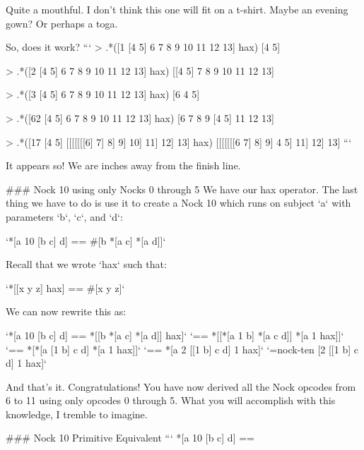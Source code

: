 \documentclass[twoside]{article}
\begin{document}
Quite a mouthful. I don't think this one will fit on a t-shirt. 
Maybe an evening gown? Or perhaps a toga.

So, does it work?
```
> .*([1 [4 5] 6 7 8 9 10 11 12 13] hax)
[4 5]

> .*([2 [4 5] 6 7 8 9 10 11 12 13] hax)
[[4 5] 7 8 9 10 11 12 13]

> .*([3 [4 5] 6 7 8 9 10 11 12 13] hax)
[6 4 5]

> .*([62 [4 5] 6 7 8 9 10 11 12 13] hax)
[6 7 8 9 [4 5] 11 12 13]

> .*([17 [4 5] [[[[[[[6] 7] 8] 9] 10] 11] 12] 13] hax)
[[[[[[[6 7] 8] 9] 4 5] 11] 12] 13]
```

It appears so! We are inches away from the finish line.

### Nock 10 using only Nocks 0 through 5
We have our hax operator. The last thing we have to do is use it to create a Nock 10 which runs on subject `a` with parameters `b`, `c`, and `d`:

`*[a 10 [b c] d] == #[b *[a c] *[a d]]`

Recall that we wrote `hax` such that:

`*[[x y z] hax] == #[x y z]`  

We can now rewrite this as:

`*[a 10 [b c] d] == *[[b *[a c] *[a d]] hax]`  
`== *[[*[a 1 b] *[a c d]] *[a 1 hax]]`  
`== *[*[a [1 b] c d] *[a 1 hax]]`  
`== *[a 2 [[1 b] c d] 1 hax]`  
`=nock-ten [2 [[1 b] c d] 1 hax]`

And that's it. Congratulations! You have now derived all the Nock opcodes from 6 to 11 using only opcodes 0 through 5. What you will accomplish with this knowledge, I tremble to imagine.

### Nock 10 Primitive Equivalent
```
*[a 10 [b c] d] ==
\end{document}
